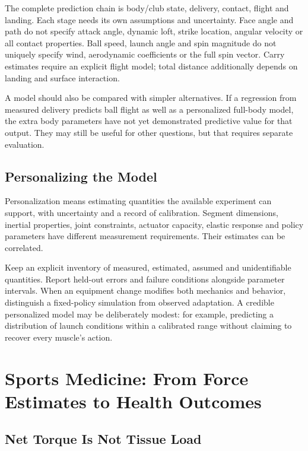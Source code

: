 The complete prediction chain is body/club state, delivery, contact, flight and landing. Each stage needs its own assumptions and uncertainty. Face angle and path do not specify attack angle, dynamic loft, strike location, angular velocity or all contact properties. Ball speed, launch angle and spin magnitude do not uniquely specify wind, aerodynamic coefficients or the full spin vector. Carry estimates require an explicit flight model; total distance additionally depends on landing and surface interaction.

A model should also be compared with simpler alternatives. If a regression from measured delivery predicts ball flight as well as a personalized full-body model, the extra body parameters have not yet demonstrated predictive value for that output. They may still be useful for other questions, but that requires separate evaluation.

\subsection{Personalizing the Model}

Personalization means estimating quantities the available experiment can support, with uncertainty and a record of calibration. Segment dimensions, inertial properties, joint constraints, actuator capacity, elastic response and policy parameters have different measurement requirements. Their estimates can be correlated.

Keep an explicit inventory of measured, estimated, assumed and unidentifiable quantities. Report held-out errors and failure conditions alongside parameter intervals. When an equipment change modifies both mechanics and behavior, distinguish a fixed-policy simulation from observed adaptation. A credible personalized model may be deliberately modest: for example, predicting a distribution of launch conditions within a calibrated range without claiming to recover every muscle's action.

\section{Sports Medicine: From Force Estimates to Health Outcomes}

\subsection{Net Torque Is Not Tissue Load}
\label{ex:ch13:rotator_cuff_training}

